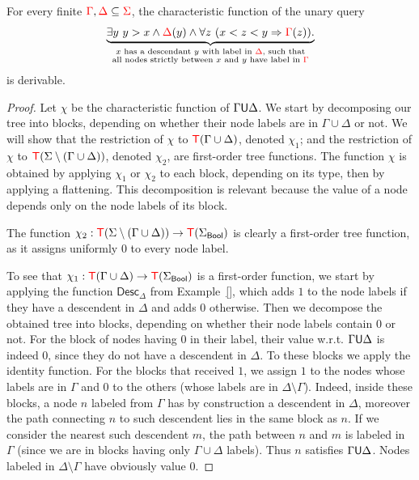 \begin{lemma}\label{lem:untilmod}
For every finite ${\color{red}{\Gamma}}, {\color{red}{\Delta}} \subseteq {\color{red}{\Sigma}}$,  the characteristic function of the unary query
         \begin{align*}
              \underbrace{\exists y\ y > x \land {\color{red}{\Delta}}(y) \land  \forall z \ (x < z < y \Rightarrow {\color{red}{\Gamma}}(z)).}_{\substack{\text{$x$ has a descendant $y$ with label in ${\color{red}{\Delta}}$, such that}\\ \text{all nodes strictly between $x$ and $y$ have label in ${\color{red}{\Gamma}}$}}} 
              \end{align*}
is derivable.
\end{lemma}
\begin{proof}
Let $\chi$ be the characteristic function of $\Gamma \mathsf U \Delta$.
We start by decomposing our tree into blocks, depending on whether their node labels are in $\Gamma\cup\Delta$ or not. We will show that the restriction of $\chi$ to ${\color{red}{\mathsf T}} (\Gamma\cup\Delta)$, denoted $\chi_1$; and the restriction of $\chi$ to ${\color{red}{\mathsf T}} (\Sigma\setminus(\Gamma\cup\Delta))$, denoted $\chi_2$, are first-order tree functions. The function $\chi$ is obtained by applying $\chi_1$ or $\chi_2$ to each block, depending on its type, then by applying a flattening.
This decomposition is relevant because the value of a node depends only on the node labels of its block. %

The function $\chi_2:{\color{red}{\mathsf T}} (\Sigma\setminus(\Gamma\cup\Delta))\to {\color{red}{\mathsf T}}(\Sigma_{\sf{Bool}})$ is clearly a first-order tree function, as it assigns uniformly $0$ to every node label. 

To see that $\chi_1:{\color{red}{\mathsf T}} (\Gamma\cup\Delta)\to {\color{red}{\mathsf T}}(\Sigma_{\sf{Bool}})$ 
is a first-order function, we start by applying the function $\mathsf{Desc}_\Delta$ from
Example~\ref{}, which adds $1$ to the node labels if they have a descendent in $\Delta$ and adds $0$ otherwise. Then we decompose the obtained tree into blocks, depending on whether their node labels contain $0$ or not. For the block of nodes having $0$ in their label, their value w.r.t. $\Gamma\mathsf U \Delta$ is indeed $0$, since they do not have a descendent in $\Delta$. To these blocks we apply the identity function. For the blocks that received $1$, we assign $1$ to the nodes whose labels are in  $\Gamma$ and $0$ to the others (whose labels are in $\Delta\setminus\Gamma$). Indeed, inside these blocks, a node $n$ labeled from $\Gamma$ has by construction a descendent in $\Delta$, moreover the path connecting $n$ to such descendent lies in the same block as $n$. If we consider the nearest such descendent $m$, the path between $n$ and $m$  is labeled in $\Gamma$ (since we are in blocks having only $\Gamma\cup\Delta$ labels). Thus $n$ satisfies $\Gamma\mathsf U\Delta$. Nodes labeled in $\Delta\setminus\Gamma$ have obviously value $0$.      
\end{proof}


